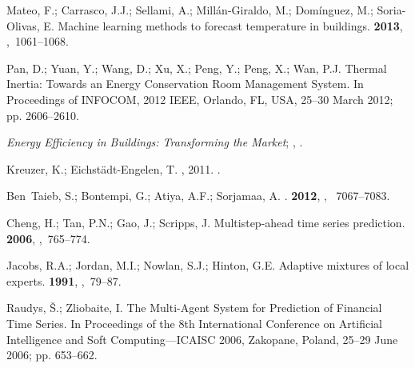 \documentclass[energies,article,accept,moreauthors,pdftex,12pt,a4paper]{mdpi}
\begin{document}
\begin{thebibliography}{----}
Mateo, F.; Carrasco, J.J.; Sellami, A.; Millán-Giraldo, M.; Domínguez, M.;
 Soria-Olivas, E.
\newblock Machine learning methods to forecast temperature in buildings.
 {\bf 2013},
,~1061--1068.

Pan, D.; Yuan, Y.; Wang, D.; Xu, X.; Peng, Y.; Peng, X.; Wan, P.J.
\newblock Thermal Inertia: Towards an Energy Conservation Room Management System.
\newblock In Proceedings of INFOCOM,  2012 IEEE, Orlando, FL, USA, 25--30 March 2012;
\newblock pp. 2606--2610.

{\it Energy Efficiency in Buildings: Transforming the Market}; 
,
.

Kreuzer, K.; Eichst\"adt-Engelen, T.
, 2011.
\newblock
{}.

Ben~Taieb, S.; Bontempi, G.; Atiya, A.F.; Sorjamaa, A.
.
 {\bf 2012},
,
\newblock ~7067--7083.

Cheng, H.; Tan, P.N.; Gao, J.; Scripps, J.
\newblock Multistep-ahead time series prediction.
 {\bf 2006},
,~765--774.

Jacobs, R.A.; Jordan, M.I.; Nowlan, S.J.; Hinton, G.E.
\newblock Adaptive mixtures of local experts.
 {\bf 1991},
,~79--87.

Raudys, Š.; Zliobaite, I.
\newblock The Multi-Agent System for Prediction of Financial Time Series. \linebreak In Proceedings of the 8th International Conference on Artificial
 Intelligence and Soft \linebreak Computing---ICAISC 2006, Zakopane, Poland, 25--29 June 2006;
\newblock pp. 653--662.


\end{thebibliography}
\end{document}
